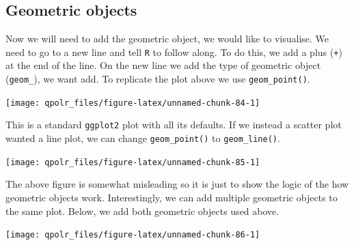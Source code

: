 \documentclass[12pt,oneside]{reedthesis}
\theoremstyle{definition}
\theoremstyle{definition}
\theoremstyle{definition}
\theoremstyle{remark}
\begin{document}
  \subsection{Geometric objects}\label{geometric-objects}
  
  Now we will need to add the geometric object, we would like to
  visualise. We need to go to a new line and tell \texttt{R} to follow
  along. To do this, we add a plus (\texttt{+}) at the end of the line. On
  the new line we add the type of geometric object (\texttt{geom\_}), we
  want add. To replicate the plot above we use \texttt{geom\_point()}.
  \begin{Shaded}
  \begin{Highlighting}[]
  \NormalTok{(}\OperatorTok{+}
  \StringTok{  }\NormalTok{()}
  \end{Highlighting}
  \end{Shaded}
  \begin{center}\texttt{[image: qpolr\_files/figure-latex/unnamed-chunk-84-1]} \end{center}
  
  This is a standard \texttt{ggplot2} plot with all its defaults. If we
  instead a scatter plot wanted a line plot, we can change
  \texttt{geom\_point()} to \texttt{geom\_line()}.
  \begin{Shaded}
  \begin{Highlighting}[]
  \NormalTok{(}\OperatorTok{+}
  \StringTok{  }\NormalTok{()}
  \end{Highlighting}
  \end{Shaded}
  \begin{center}\texttt{[image: qpolr\_files/figure-latex/unnamed-chunk-85-1]} \end{center}
  
  The above figure is somewhat misleading so it is just to show the logic
  of the how geometric objects work. Interestingly, we can add multiple
  geometric objects to the same plot. Below, we add both geometric objects
  used above.
  \begin{Shaded}
  \begin{Highlighting}[]
  \NormalTok{(}\OperatorTok{+}
  \StringTok{  }\NormalTok{() }\OperatorTok{+}
  \StringTok{  }\NormalTok{()}
  \end{Highlighting}
  \end{Shaded}
  \begin{center}\texttt{[image: qpolr\_files/figure-latex/unnamed-chunk-86-1]} \end{center}
  
\end{document}
